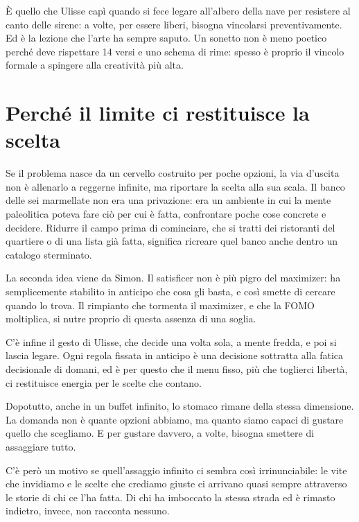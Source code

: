 È quello che Ulisse capì quando si fece legare all'albero della nave per resistere al canto delle sirene: a volte, per essere liberi, bisogna vincolarsi preventivamente. Ed è la lezione che l'arte ha sempre saputo. Un sonetto non è meno poetico perché deve rispettare 14 versi e uno schema di rime: spesso è proprio il vincolo formale a spingere alla creatività più alta.

\section{Perché il limite ci restituisce la scelta}

Se il problema nasce da un cervello costruito per poche opzioni, la via d'uscita non è allenarlo a reggerne infinite, ma riportare la scelta alla sua scala. Il banco delle sei marmellate non era una privazione: era un ambiente in cui la mente paleolitica poteva fare ciò per cui è fatta, confrontare poche cose concrete e decidere. Ridurre il campo prima di cominciare, che si tratti dei ristoranti del quartiere o di una lista già fatta, significa ricreare quel banco anche dentro un catalogo sterminato.

La seconda idea viene da Simon. Il satisficer non è più pigro del maximizer: ha semplicemente stabilito in anticipo che cosa gli basta, e così smette di cercare quando lo trova. Il rimpianto che tormenta il maximizer, e che la FOMO moltiplica, si nutre proprio di questa assenza di una soglia.

C'è infine il gesto di Ulisse, che decide una volta sola, a mente fredda, e poi si lascia legare. Ogni regola fissata in anticipo è una decisione sottratta alla fatica decisionale di domani, ed è per questo che il menu fisso, più che toglierci libertà, ci restituisce energia per le scelte che contano.

\bigskip

Dopotutto, anche in un buffet infinito, lo stomaco rimane della stessa dimensione. La domanda non è quante opzioni abbiamo, ma quanto siamo capaci di gustare quello che scegliamo. E per gustare davvero, a volte, bisogna smettere di assaggiare tutto.

C'è però un motivo se quell'assaggio infinito ci sembra così irrinunciabile: le vite che invidiamo e le scelte che crediamo giuste ci arrivano quasi sempre attraverso le storie di chi ce l'ha fatta. Di chi ha imboccato la stessa strada ed è rimasto indietro, invece, non racconta nessuno.
